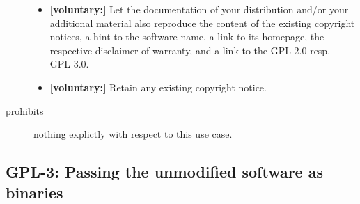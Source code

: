 \begin{description}
\begin{itemize}
  \item \textbf{[voluntary:]} Let the documentation of your distribution and/or
  your additional material also reproduce the content of the existing
  copyright notices, a hint to the software name, a link to its homepage,
  the respective disclaimer of warranty, and a link to the GPL-2.0 resp.
  GPL-3.0.
  
  \item \textbf{[voluntary:]} Retain any existing copyright notice. 
  
\end{itemize}

\item[prohibits] nothing explictly with respect to this use case.

\end{description}


\subsection{GPL-3: Passing the unmodified software as binaries} 

